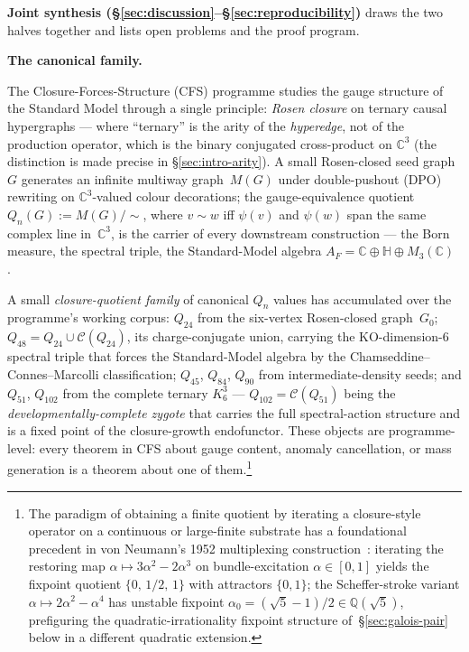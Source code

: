 \documentclass[12pt,a4paper]{article}
\theoremstyle{definition}
\theoremstyle{remark}
\newcommand{\bC}{\mathbb{C}}
\newcommand{\bH}{\mathbb{H}}
\newcommand{\bQ}{\mathbb{Q}}                %
\newcommand{\Qn}{Q_n}
\newcommand{\Ccls}{\mathcal{C}}             %
\begin{document}
\medskip\noindent
\textbf{Joint synthesis (\S\ref{sec:discussion}--\S\ref{sec:reproducibility})}
draws the two halves together and lists open problems and the proof
program.

\medskip\noindent\textbf{The canonical family.}\label{sec:intro-family}

The Closure-Forces-Structure (CFS) programme studies the gauge structure
of the Standard Model through a single principle: \emph{Rosen closure} on
ternary causal hypergraphs --- where ``ternary'' is the arity of the
\emph{hyperedge}, not of the production operator, which is the binary
conjugated cross-product on $\mathbb{C}^3$ (the distinction is made
precise in \S\ref{sec:intro-arity}). A small Rosen-closed seed graph~$G$
generates an infinite multiway graph~$M(G)$ under double-pushout (DPO)
rewriting on $\bC^3$-valued colour decorations; the gauge-equivalence
quotient
$\Qn(G) := M(G)/{\sim}$, where $v \sim w$ iff $\psi(v)$ and $\psi(w)$
span the same complex line in~$\bC^3$, is the carrier of every
downstream construction --- the Born measure, the spectral triple, the
Standard-Model algebra $A_F = \bC \oplus \bH \oplus M_3(\bC)$
\cite{CFS2026}.

A small \emph{closure-quotient family} of canonical $\Qn$ values has
accumulated over the programme's working corpus: $Q_{24}$ from the
six-vertex Rosen-closed graph~$G_0$; $Q_{48} = Q_{24} \cup \Ccls(Q_{24})$,
its charge-conjugate union, carrying the KO-dimension-$6$ spectral triple
that forces the Standard-Model algebra by the
Chamseddine--Connes--Marcolli classification; $Q_{45}$, $Q_{84}$, $Q_{90}$
from intermediate-density seeds; and $Q_{51}$, $Q_{102}$ from the
complete ternary $K_6^3$ --- $Q_{102} = \Ccls(Q_{51})$ being the
\emph{developmentally-complete zygote} that carries the full
spectral-action structure and is a fixed point of the closure-growth
endofunctor. These objects are programme-level: every theorem in CFS
about gauge content, anomaly cancellation, or mass generation is a
theorem about one of them.\footnote{The paradigm of obtaining a finite
quotient by iterating a closure-style operator on a continuous or
large-finite substrate has a foundational precedent in von Neumann's
1952 multiplexing construction~\cite{vonNeumann1952}: iterating the
restoring map $\alpha \mapsto 3\alpha^2 - 2\alpha^3$ on bundle-excitation
$\alpha \in [0,1]$ yields the fixpoint quotient $\{0,\,1/2,\,1\}$ with
attractors $\{0,1\}$; the Scheffer-stroke variant $\alpha \mapsto
2\alpha^2 - \alpha^4$ has unstable fixpoint
$\alpha_0 = (\sqrt 5 - 1)/2 \in \bQ(\sqrt 5)$, prefiguring the
quadratic-irrationality fixpoint structure of~\S\ref{sec:galois-pair}
below in a different quadratic extension.}
\end{document}
